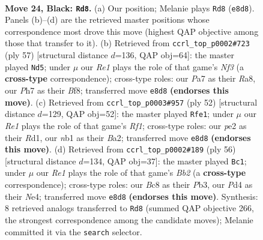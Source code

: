\documentclass[11pt]{article}
\begin{document}
\clearpage

\begin{figure}[p]\centering
\begin{subfigure}{0.46\textwidth}\centering
\resizebox{\linewidth}{!}{%
\newchessgame
\chessboard[
  setfen={r1b1r1k1/p2nb2p/2p5/3q4/Pp1p1P2/1P1Q4/3NPK2/RNBR4 b - - 0 24},
  showmover=false,
  pgfstyle=straightmove, color=movearrow, markmove={e8-d8}
]}
\caption{}
\end{subfigure}\hfill
\begin{subfigure}{0.46\textwidth}\centering
\resizebox{\linewidth}{!}{%
\newchessgame
\chessboard[
  setfen={r4bk1/1qr2p2/4pn1p/p3N1p1/Q1N5/2P3P1/1P3PP1/3RR1K1 b - - 3 29},
  showmover=false,
  pgfstyle=straightmove, color=movearrow, markmove={f6-d5}
]}
\caption{}
\end{subfigure}
\\[4pt]
\begin{subfigure}{0.46\textwidth}\centering
\resizebox{\linewidth}{!}{%
\newchessgame
\chessboard[
  setfen={4k2r/2qnb2p/1n1p1p2/p4P2/1r1B4/4QP2/BPP4P/3R1RK1 w k - 3 27},
  showmover=false,
  pgfstyle=straightmove, color=movearrow, markmove={f1-e1}
]}
\caption{}
\end{subfigure}\hfill
\begin{subfigure}{0.46\textwidth}\centering
\resizebox{\linewidth}{!}{%
\newchessgame
\chessboard[
  setfen={1b1r2k1/pp3pp1/q4n1p/3n1B2/3PN2P/1P1P2P1/PB2Q1K1/5R2 w - - 5 29},
  showmover=false,
  pgfstyle=straightmove, color=movearrow, markmove={b2-c1}
]}
\caption{}
\end{subfigure}
\caption{\textbf{Move 24, Black: \texttt{Rd8}.} (a) Our position; Melanie plays \texttt{Rd8} (\texttt{e8d8}). Panels (b)--(d) are the retrieved master positions whose correspondence most drove this move (highest QAP objective among those that transfer to it). (b) Retrieved from \texttt{ccrl\_top\_p0002\#723} (ply 57) [structural distance $d$=136, QAP obj=64]: the master played \texttt{Nd5}; under $\mu$ our \emph{Re1} plays the role of that game's \emph{Nf3} (a \textbf{cross-type} correspondence); cross-type roles: our \emph{P}a7 as their \emph{R}a8, our \emph{P}h7 as their \emph{B}f8; transferred move \texttt{e8d8} \textbf{(endorses this move)}. (c) Retrieved from \texttt{ccrl\_top\_p0003\#957} (ply 52) [structural distance $d$=129, QAP obj=52]: the master played \texttt{Rfe1}; under $\mu$ our \emph{Re1} plays the role of that game's \emph{Rf1}; cross-type roles: our \emph{p}e2 as their \emph{R}d1, our \emph{n}b1 as their \emph{B}a2; transferred move \texttt{e8d8} \textbf{(endorses this move)}. (d) Retrieved from \texttt{ccrl\_top\_p0002\#189} (ply 56) [structural distance $d$=134, QAP obj=37]: the master played \texttt{Bc1}; under $\mu$ our \emph{Re1} plays the role of that game's \emph{Bb2} (a \textbf{cross-type} correspondence); cross-type roles: our \emph{B}c8 as their \emph{P}b3, our \emph{P}d4 as their \emph{N}e4; transferred move \texttt{e8d8} \textbf{(endorses this move)}. Synthesis: 8 retrieved analogs transferred to \texttt{Rd8} (summed QAP objective 266, the strongest correspondence among the candidate moves); Melanie committed it via the \texttt{search} selector.}
\label{fig:thought-m47}
\end{figure}
\end{document}
